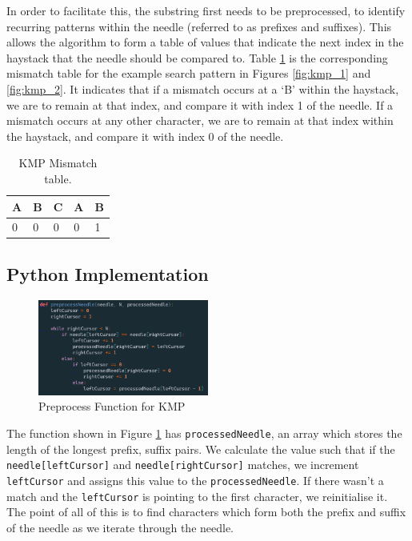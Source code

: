 In order to facilitate this, the substring first needs to be preprocessed, to identify recurring patterns within the needle (referred to as prefixes and suffixes). This allows the algorithm to form a table of values that indicate the next index in the haystack that the needle should be compared to. Table \ref{tab:kmp_table} is the corresponding mismatch table for the example search pattern in Figures \ref{fig:kmp_1} and \ref{fig:kmp_2}. It indicates that if a mismatch occurs at a `B' within the haystack, we are to remain at that index, and compare it with index 1 of the needle. If a mismatch occurs at any other character, we are to remain at that index within the haystack, and compare it with index 0 of the needle. %

\begin{table}[H]
    \centering
    \begin{tabular}{|l|l|l|l|l|}
    \hline
    A & B & C & A & B \\ \hline
    0 & 0 & 0 & 0 & 1 \\ \hline
    \end{tabular}
    \caption{KMP Mismatch table.}
    \label{tab:kmp_table}
\end{table}

\subsection*{Python Implementation}

\begin{figure}[h]
    \centering
    \includegraphics[width=0.50\textwidth]{images/preprocessKMP.png}
    \caption{Preprocess Function for KMP}
    \label{fig:KMP_preprocessing}
\end{figure}

The function shown in Figure \ref{fig:KMP_preprocessing} has \texttt{processedNeedle}, an array which stores the length of the longest prefix, suffix pairs. We calculate the value such that if the \texttt{needle[leftCursor]} and \texttt{needle[rightCursor]} matches, we increment \texttt{leftCursor} and assigns this value to the \texttt{processedNeedle}. If there wasn't a match and the \texttt{leftCursor} is pointing to the first character, we reinitialise it. The point of all of this is to find characters which form both the prefix and suffix of the needle as we iterate through the needle.


